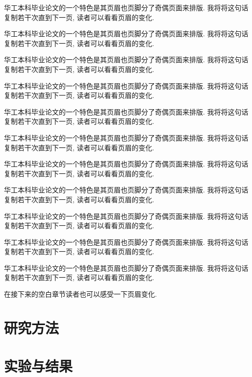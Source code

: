 \documentclass[a4paper]{article}
\begin{document}
\begin{spacing}{1.5}
华工本科毕业论文的一个特色是其页眉也页脚分了奇偶页面来排版. 我将将这句话复制若干次直到下一页, 读者可以看看页眉的变化.

华工本科毕业论文的一个特色是其页眉也页脚分了奇偶页面来排版. 我将将这句话复制若干次直到下一页, 读者可以看看页眉的变化.

华工本科毕业论文的一个特色是其页眉也页脚分了奇偶页面来排版. 我将将这句话复制若干次直到下一页, 读者可以看看页眉的变化.

华工本科毕业论文的一个特色是其页眉也页脚分了奇偶页面来排版. 我将将这句话复制若干次直到下一页, 读者可以看看页眉的变化.

华工本科毕业论文的一个特色是其页眉也页脚分了奇偶页面来排版. 我将将这句话复制若干次直到下一页, 读者可以看看页眉的变化.

华工本科毕业论文的一个特色是其页眉也页脚分了奇偶页面来排版. 我将将这句话复制若干次直到下一页, 读者可以看看页眉的变化.

华工本科毕业论文的一个特色是其页眉也页脚分了奇偶页面来排版. 我将将这句话复制若干次直到下一页, 读者可以看看页眉的变化.

华工本科毕业论文的一个特色是其页眉也页脚分了奇偶页面来排版. 我将将这句话复制若干次直到下一页, 读者可以看看页眉的变化.

华工本科毕业论文的一个特色是其页眉也页脚分了奇偶页面来排版. 我将将这句话复制若干次直到下一页, 读者可以看看页眉的变化.

华工本科毕业论文的一个特色是其页眉也页脚分了奇偶页面来排版. 我将将这句话复制若干次直到下一页, 读者可以看看页眉的变化.

华工本科毕业论文的一个特色是其页眉也页脚分了奇偶页面来排版. 我将将这句话复制若干次直到下一页, 读者可以看看页眉的变化.

在接下来的空白章节读者也可以感受一下页眉变化.

\pagebreak[4]

\section{研究方法}

\pagebreak[4]

\section{实验与结果}


\end{spacing}
\end{document}
